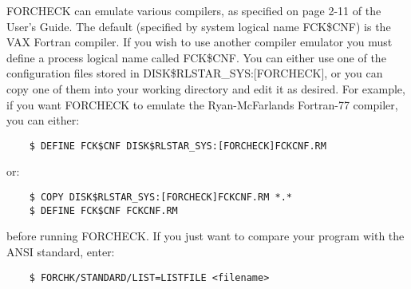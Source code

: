 FORCHECK can emulate various compilers, as specified on page 2-11 of the
User's Guide.
The default (specified by system logical name FCK\$CNF) is the VAX Fortran
compiler.
If you wish to use another compiler emulator you must define a process
logical name called FCK\$CNF.
You can either use one of the configuration files stored in
DISK\$RLSTAR\_SYS:[FORCHECK], or you can copy one of them into your working
directory and edit it as desired.
For example, if you want FORCHECK to emulate the Ryan-McFarlands
Fortran-77 compiler, you can either:
\begin{verbatim}
    $ DEFINE FCK$CNF DISK$RLSTAR_SYS:[FORCHECK]FCKCNF.RM
\end{verbatim}
or:
\begin{verbatim}
    $ COPY DISK$RLSTAR_SYS:[FORCHECK]FCKCNF.RM *.*
    $ DEFINE FCK$CNF FCKCNF.RM
\end{verbatim}
before running FORCHECK.
If you just want to compare your program with the ANSI standard, enter:
\begin{verbatim}
    $ FORCHK/STANDARD/LIST=LISTFILE <filename>
\end{verbatim}

